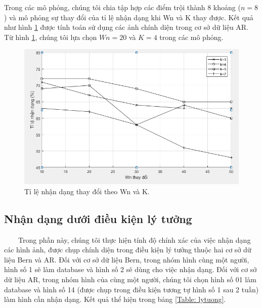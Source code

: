 \documentclass[runningheads]{llncs}
\begin{document}
Trong các mô phỏng, chúng tôi chia tập hợp các điểm trội thành 8 khoảng ($n=8$) và mô phỏng sự thay đổi của tỉ lệ nhận dạng khi Wn và K thay được. Kết quả như hình \ref{Fig: ti le nhan dang Wn K} được tính toán sử dụng các ảnh chính diện trong cơ sở dữ liệu AR. Từ hình \ref{Fig: ti le nhan dang Wn K}, chúng tôi lựa chọn $Wn=20$ và $K=4$ trong các mô phỏng.
\begin{figure}
\begin{center}
\includegraphics[scale=0.55]{figs/hinhWnK.PNG}
\caption{Tỉ lệ nhận dạng thay đổi theo Wn và K.} \label{Fig: ti le nhan dang Wn K}
\end{center}
\end{figure}


\subsection{Nhận dạng dưới điều kiện lý tưởng}
\label{ContentS: ketqualytuong}
~~~~Trong phần này, chúng tôi thực hiện tính độ chính xác của việc nhận dạng các hình ảnh, được chụp chính diện trong điều kiện lý tưởng thuộc hai cơ sở dữ liệu Bern và AR. Đối với cơ sở dữ liệu Bern, trong nhóm hình cùng một người, hình số 1 sẽ làm database và hình số 2 sẽ dùng cho việc nhận dạng. Đối với cơ sở dữ liệu AR, trong nhóm hình của cùng một người, chúng tôi chọn hình số 01 làm database và hình số 14 (được chụp trong điều kiện tương tự hình số 1 sau 2 tuần) làm hình cần nhận dạng. Kết quả thể hiện trong bảng \ref{Table: lytuong}.
\end{document}
